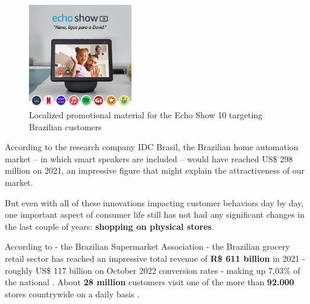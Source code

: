 \documentclass[openright]{normas-utf-tex} %
\begin{document}
\begin{figure}[h!]
	\centering
	\includegraphics[width=0.4\textwidth]{./images/alexabr.jpg} %
	\caption[Localized promotional material for the Echo Show 10 targeting Brazilian customers]{Localized promotional material for the Echo Show 10 targeting Brazilian customers}
    \label{fig:alexabr}
\end{figure}

According to the research company IDC Brasil, the Brazilian home automation
market -- in which smart speakers are included -- would have reached US\$ 298
million on 2021, an impressive figure that might explain the attractiveness of
our market.

%


But even with all of these innovations impacting customer behaviors day by day, one
important aspect of consumer life still has not had any significant changes in
the last couple of years: \textbf{shopping on
physical stores}.

According to  - the
Brazilian Supermarket Association - the Brazilian grocery retail sector has reached an
impressive total revenue of \textbf{R\$ 611 billion} in 2021 - roughly US\$ 117 billion on
October 2022 conversion rates - making up 7,03\% of the national . About \textbf{28 million} customers visit one of the more than
\textbf{92.000} stores countrywide on a daily basis \cite{Abras2022}.
\end{document}
